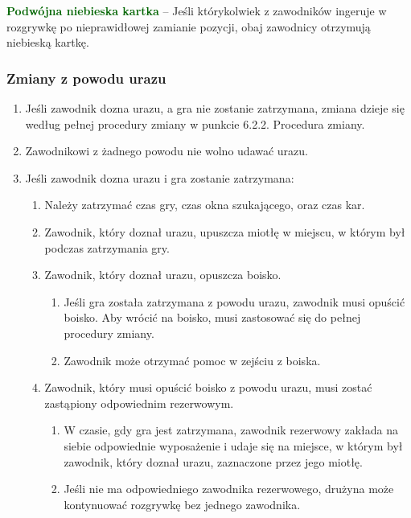 \documentclass[12pt]{article}
\newcommand\other[1]{\bgroup\textcolor{darkgreen}{\textbf{#1}}}
\begin{document}
\other{Podwójna niebieska kartka} -- Jeśli którykolwiek z zawodników
ingeruje w rozgrywkę po nieprawidłowej zamianie pozycji, obaj zawodnicy
otrzymują niebieską kartkę.

\subsubsection{Zmiany z powodu urazu}

\begin{enumerate}
	\item
	      Jeśli zawodnik dozna urazu, a gra nie zostanie zatrzymana, zmiana
	      dzieje się według pełnej procedury zmiany w punkcie 6.2.2. Procedura
	      zmiany.
	\item
	      Zawodnikowi z żadnego powodu nie wolno udawać urazu.
	\item
	      Jeśli zawodnik dozna urazu i gra zostanie zatrzymana:

	      \begin{enumerate}
		      \item
		            Należy zatrzymać czas gry, czas okna szukającego, oraz czas kar.
		      \item
		            Zawodnik, który doznał urazu, upuszcza miotłę w miejscu, w którym
		            był podczas zatrzymania gry.
		      \item
		            Zawodnik, który doznał urazu, opuszcza boisko.

		            \begin{enumerate}
			            \item
			                  Jeśli gra została zatrzymana z powodu urazu, zawodnik musi opuścić
			                  boisko. Aby wrócić na boisko, musi zastosować się do pełnej
			                  procedury zmiany.
			            \item
			                  Zawodnik może otrzymać pomoc w zejściu z boiska.
		            \end{enumerate}
		      \item
		            Zawodnik, który musi opuścić boisko z powodu urazu, musi zostać
		            zastąpiony odpowiednim rezerwowym.

		            \begin{enumerate}
			            \item
			                  W czasie, gdy gra jest zatrzymana, zawodnik rezerwowy zakłada na
			                  siebie odpowiednie wyposażenie i udaje się na miejsce, w którym
			                  był zawodnik, który doznał urazu, zaznaczone przez jego miotłę.
			            \item
			                  Jeśli nie ma odpowiedniego zawodnika rezerwowego, drużyna może
			                  kontynuować rozgrywkę bez jednego zawodnika.
		            \end{enumerate}
	      \end{enumerate}
\end{enumerate}
\end{document}
